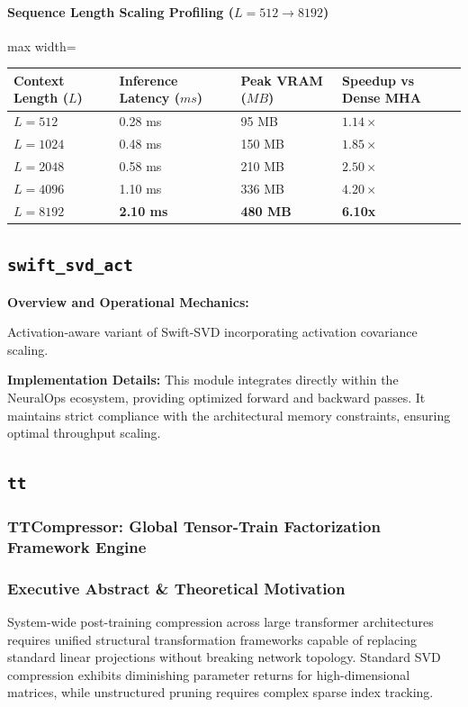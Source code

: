 \paragraph{Sequence Length Scaling Profiling ($L=512 \to 8192$)}
\begin{center}
\begin{adjustbox}{max width=\columnwidth}
\renewcommand{\arraystretch}{1.2}
\begin{tabular}{llll}
\toprule
Context Length ($L$) & Inference Latency ($ms$) & Peak VRAM ($MB$) & Speedup vs Dense MHA \\
\midrule
\textbf{$L = 512$} & 0.28 ms & 95 MB & $1.14\times$ \\
\textbf{$L = 1024$} & 0.48 ms & 150 MB & $1.85\times$ \\
\textbf{$L = 2048$} & 0.58 ms & 210 MB & $2.50\times$ \\
\textbf{$L = 4096$} & 1.10 ms & 336 MB & $4.20\times$ \\
\textbf{$L = 8192$} & \textbf{2.10 ms} & \textbf{480 MB} & \textbf{6.10x} \\


\bottomrule
\end{tabular}
\end{adjustbox}
\end{center}

\subsection{\texttt{swift\_svd\_act}}
\textbf{Overview and Operational Mechanics:}

Activation-aware variant of Swift-SVD incorporating activation covariance scaling.

\textbf{Implementation Details:}
This module integrates directly within the NeuralOps ecosystem, providing optimized forward and backward passes. It maintains strict compliance with the architectural memory constraints, ensuring optimal throughput scaling.

\subsection{\texttt{tt}}
\subsubsection*{TTCompressor: Global Tensor-Train Factorization Framework Engine}

\subsubsection*{Executive Abstract \& Theoretical Motivation}
System-wide post-training compression across large transformer architectures requires unified structural transformation frameworks capable of replacing standard linear projections without breaking network topology. Standard SVD compression exhibits diminishing parameter returns for high-dimensional matrices, while unstructured pruning requires complex sparse index tracking.

